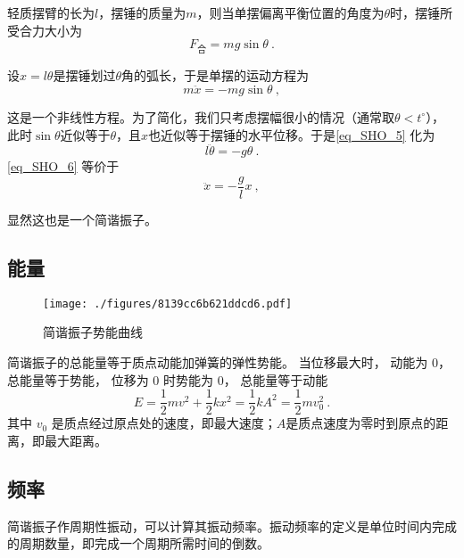轻质摆臂的长为$l$，摆锤的质量为$m$，则当单摆偏离平衡位置的角度为$\theta$时，摆锤所受合力大小为
\begin{equation}
F_{\text{合}} = mg\sin\theta~.
\end{equation}

设$x=l\theta$是摆锤划过$\theta$角的弧长，于是单摆的运动方程为
\begin{equation}\label{eq_SHO_5}
m\ddot{x} = -mg\sin\theta~,
\end{equation}

这是一个非线性方程。为了简化，我们只考虑摆幅很小的情况（通常取$\theta<t^\circ$），此时$\sin\theta$近似等于$\theta$，且$x$也近似等于摆锤的水平位移。于是\autoref{eq_SHO_5} 化为
\begin{equation}\label{eq_SHO_6}
l\ddot{\theta} = -g\theta~.
\end{equation}
\autoref{eq_SHO_6} 等价于
\begin{equation}\label{eq_SHO_7}
\ddot{x} = -\frac{g}{l}x~,
\end{equation}

显然这也是一个简谐振子。



\subsection{能量}

\begin{figure}[ht]
\centering
\texttt{[image: ./figures/8139cc6b621ddcd6.pdf]}
\caption{简谐振子势能曲线} \label{fig_SHO_2}
\end{figure}

简谐振子的总能量等于质点动能加弹簧的弹性势能。 当位移最大时， 动能为 0， 总能量等于势能， 位移为 0 时势能为 0， 总能量等于动能
\begin{equation}
E = \frac{1}{2} mv^2 + \frac12 k x^2 = \frac12 k A^2 = \frac12 m v_0^2~.
\end{equation}
其中 $v_0$ 是质点经过原点处的速度，即最大速度；$A$是质点速度为零时到原点的距离，即最大距离。


\subsection{频率}

简谐振子作周期性振动，可以计算其振动频率。振动频率的定义是单位时间内完成的周期数量，即完成一个周期所需时间的倒数。

